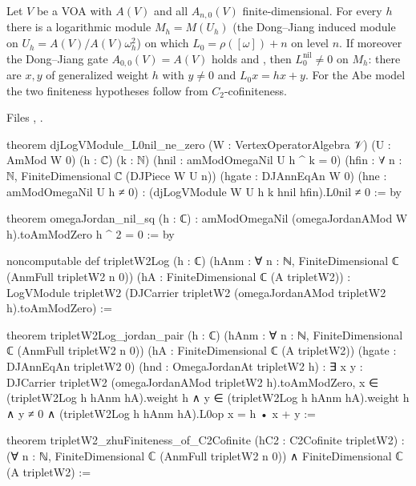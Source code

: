 \begin{theorem}\label{l18:thm:logmodule}
Let $V$ be a VOA with $A(V)$ and all $A_{n,0}(V)$ finite-dimensional. For every $h$ there is a logarithmic module
$M_h=M(U_h)$ (the Dong--Jiang induced module on $U_h=A(V)/A(V)\omega_h^2$) on which $L_0=\rho([\omega])+n$ on level
$n$. If moreover the Dong--Jiang gate $A_{0,0}(V)=A(V)$ holds and , then
$L_0^{\mathrm{nil}}\ne0$ on $M_h$: there are $x,y$ of generalized weight $h$ with $y\ne0$ and $L_0x=hx+y$.
For the Abe model the two finiteness hypotheses follow from $C_2$-cofiniteness.
\end{theorem}
\noindent Files ,
.
\begin{leancode}
theorem djLogVModule_L0nil_ne_zero (W : VertexOperatorAlgebra 𝒱) (U : AmMod W 0) (h : ℂ) (k : ℕ)
    (hnil : amModOmegaNil U h ^ k = 0)
    (hfin : ∀ n : ℕ, FiniteDimensional ℂ (DJPiece W U n))
    (hgate : DJAnnEqAn W 0) (hne : amModOmegaNil U h ≠ 0) :
    (djLogVModule W U h k hnil hfin).L0nil ≠ 0 := by

theorem omegaJordan_nil_sq (h : ℂ) :
    amModOmegaNil (omegaJordanAMod W h).toAmModZero h ^ 2 = 0 := by

noncomputable def tripletW2Log (h : ℂ)
    (hAnm : ∀ n : ℕ, FiniteDimensional ℂ (AnmFull tripletW2 n 0))
    (hA : FiniteDimensional ℂ (A tripletW2)) :
    LogVModule tripletW2
      (DJCarrier tripletW2 (omegaJordanAMod tripletW2 h).toAmModZero) :=

theorem tripletW2Log_jordan_pair (h : ℂ)
    (hAnm : ∀ n : ℕ, FiniteDimensional ℂ (AnmFull tripletW2 n 0))
    (hA : FiniteDimensional ℂ (A tripletW2)) (hgate : DJAnnEqAn tripletW2 0)
    (hnd : OmegaJordanAt tripletW2 h) :
    ∃ x y : DJCarrier tripletW2 (omegaJordanAMod tripletW2 h).toAmModZero,
      x ∈ (tripletW2Log h hAnm hA).weight h ∧ y ∈ (tripletW2Log h hAnm hA).weight h ∧
        y ≠ 0 ∧ (tripletW2Log h hAnm hA).L0op x = h • x + y :=
\end{leancode}
\begin{leancode}
theorem tripletW2_zhuFiniteness_of_C2Cofinite (hC2 : C2Cofinite tripletW2) :
    (∀ n : ℕ, FiniteDimensional ℂ (AnmFull tripletW2 n 0))
      ∧ FiniteDimensional ℂ (A tripletW2) :=
\end{leancode}
